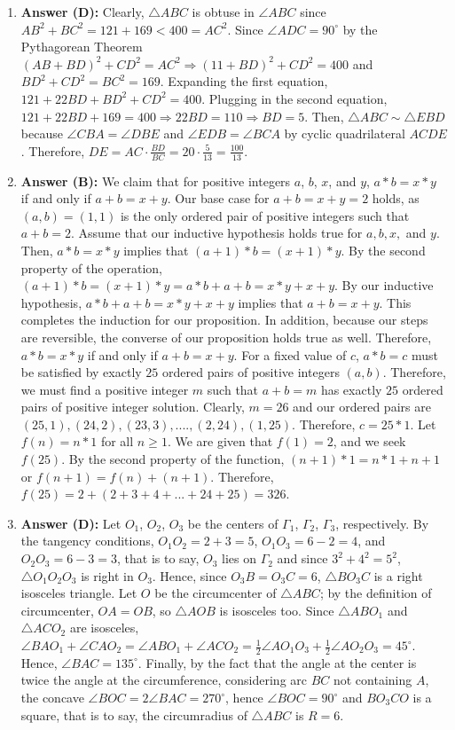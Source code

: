 \documentclass[12pt]{scrartcl}
\begin{document}
\begin{enumerate}
\item \textbf{Answer (D):} Clearly, $\triangle ABC$ is obtuse in $\angle ABC$ since $AB^{2}+BC^{2}=121+169<400=AC^{2}$. Since $\angle ADC=90^{\circ}$ by the Pythagorean Theorem $(AB+BD)^{2}+CD^{2}=AC^{2}\Rightarrow(11+BD)^{2}+CD^{2}=400$ and $BD^{2}+CD^{2}=BC^{2}=169$. Expanding the first equation, $121+22BD+BD^{2}+CD^{2}=400$. Plugging in the second equation, $121+22BD+169=400\Rightarrow22BD=110\Rightarrow BD=5$. Then, $\triangle ABC \sim \triangle EBD$ because $\angle CBA=\angle DBE$ and $\angle EDB=\angle BCA$ by cyclic quadrilateral $ACDE$. Therefore, $DE=AC\cdot\frac{BD}{BC}=20\cdot\frac{5}{13}=\frac{100}{13}$.

\item \textbf{Answer (B):} We claim that for positive integers $a$, $b$, $x$, and $y$, $a*b=x*y$ if and only if $a+b=x+y$. Our base case for $a+b=x+y=2$ holds, as $(a,b)=(1,1)$ is the only ordered pair of positive integers such that $a+b=2$. Assume that our inductive hypothesis holds true for $a,b,x,$ and $y$. Then, $a*b=x*y$ implies that $(a+1)*b=(x+1)*y$. By the second property of the operation, $(a+1)*b=(x+1)*y=a*b+a+b=x*y+x+y$. By our inductive hypothesis, $a*b+a+b=x*y+x+y$ implies that $a+b=x+y$. This completes the induction for our proposition. In addition, because our steps are reversible, the converse of our proposition holds true as well. Therefore, $a*b=x*y$ if and only if $a+b=x+y$. For a fixed value of $c$, $a*b=c$ must be satisfied by exactly $25$ ordered pairs of positive integers $(a, b)$. Therefore, we must find a positive integer $m$ such that $a+b=m$ has exactly $25$ ordered pairs of positive integer solution. Clearly, $m=26$ and our ordered pairs are $(25,1), (24, 2), (23, 3), ...., (2, 24), (1, 25)$. Therefore, $c=25*1$. Let $f(n)=n*1$ for all $n\ge1$. We are given that $f(1)=2$, and we seek $f(25)$. By the second property of the function, $(n+1)*1=n*1+n+1$ or $f(n+1)=f(n)+(n+1)$. Therefore, $f(25)=2+(2+3+4+...+24+25)=326$.

\item \textbf{Answer (D):} Let $O_{1}$, $O_{2}$, $O_{3}$ be the centers of $\Gamma_{1}$, $\Gamma_{2}$, $\Gamma_{3}$, respectively. By the tangency conditions, $O_{1}O_{2}=2+3=5$, $O_{1}O_{3}=6-2=4$, and $O_{2}O_{3}=6-3=3$, that is to say, $O_{3}$ lies on $\Gamma_{2}$ and since $3^{2}+4^{2}=5^{2}$, $\triangle O_{1}O_{2}O_{3}$ is right in $O_{3}$. Hence, since $O_{3}B=O_{3}C=6$, $\triangle BO_{3}C$ is a right isosceles triangle. Let $O$ be the circumcenter of $\triangle ABC$; by the definition of circumcenter, $OA=OB$, so $\triangle AOB$ is isosceles too. Since $\triangle ABO_{1}$ and $\triangle ACO_{2}$ are isosceles, $\angle BAO_{1}+\angle CAO_{2}=\angle ABO_{1}+\angle ACO_{2}=\frac{1}{2}\angle AO_{1}O_{3}+\frac{1}{2}\angle AO_{2}O_{3}=45^{\circ}$. Hence, $\angle BAC=135^{\circ}$. Finally, by the fact that the angle at the center is twice the angle at the circumference, considering arc $BC$ not containing $A$, the concave $\angle BOC=2\angle BAC=270^{\circ}$, hence $\angle BOC=90^{\circ}$ and $BO_{3}CO$ is a square, that is to say, the circumradius of $\triangle ABC$ is $R=6$.


\end{enumerate}
\end{document}
